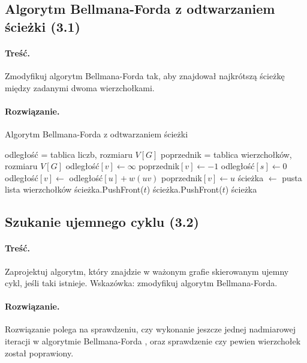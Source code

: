\subsection{Algorytm Bellmana-Forda z odtwarzaniem ścieżki (3.1)}
\paragraph{Treść.}Zmodyfikuj algorytm Bellmana-Forda tak, 
aby znajdował najkrótszą ścieżkę między zadanymi dwoma
wierzchołkami.

\paragraph{Rozwiązanie.}

\begin{algorithm}[H]
	\caption{Algorytm Bellmana-Forda z odtwarzaniem ścieżki}
	\begin{algorithmic}[1]

		\State odległość = tablica liczb, rozmiaru $V[G]$
		\State poprzednik = tablica wierzchołków, rozmiaru $V[G]$
		\State odległość$[v]\gets\infty$
		\State poprzednik$[v]\gets-1$
		\EndFor
		\State odległość$[s]\gets0$
		\State odległość$[v]\gets$ odległość$[u] + w(uv)$ 
		\State poprzednik$[v]\gets u$
		\EndIf
		\EndFor
		\EndFor
		\State ścieżka $\gets$ pusta lista wierzchołków
		\State ścieżka.PushFront($t$)
		\State ścieżka.PushFront($t$)
		\EndWhile
		\State \Return ścieżka
		\EndProcedure
	\end{algorithmic}
	\label{Zadanie31}
\end{algorithm}
\subsection{Szukanie ujemnego cyklu (3.2)}
\paragraph{Treść.}Zaprojektuj algorytm, który znajdzie w 
ważonym grafie skierowanym ujemny cykl, jeśli taki istnieje.
Wskazówka: zmodyfikuj algorytm Bellmana-Forda.

\paragraph{Rozwiązanie.}
Rozwiązanie polega na sprawdzeniu, czy wykonanie
jeszcze jednej nadmiarowej iteracji 
w algorytmie Bellmana-Forda %
, oraz sprawdzenie
czy pewien wierzchołek został poprawiony. %


